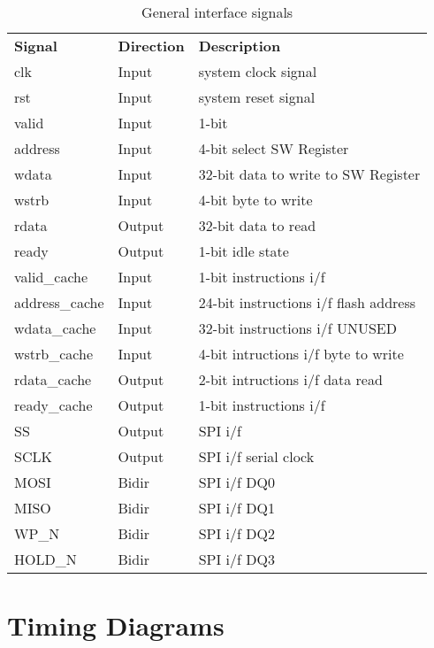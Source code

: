 \documentclass{../../submodules/TEX/document/ug/ug}
\theoremstyle{plain}
\begin{document}
\begin{table}[t]
  \begin{center}
    \begin{tabular}{|l|l|p{8cm}|}
      \hline
      \rowcolor{iob-green}
      \textbf{Signal} & \textbf{Direction} & \textbf{Description} \\
      clk & Input & system clock signal\\
      rst & Input & system reset signal\\
      valid & Input & 1-bit\\
      address & Input & 4-bit select SW Register\\
      wdata & Input & 32-bit data to write to SW Register\\
      wstrb & Input & 4-bit byte to write\\
      rdata & Output & 32-bit data to read\\
      ready & Output & 1-bit idle state\\
      valid\_cache & Input & 1-bit instructions i/f\\
      address\_cache & Input & 24-bit instructions i/f flash address\\
      wdata\_cache & Input & 32-bit instructions i/f UNUSED\\
      wstrb\_cache & Input & 4-bit intructions i/f byte to write\\
      rdata\_cache & Output & 2-bit intructions i/f data read\\
      ready\_cache & Output & 1-bit instructions i/f\\
      SS & Output & SPI i/f \\
      SCLK & Output & SPI i/f serial clock\\
      MOSI & Bidir & SPI i/f DQ0\\
      MISO & Bidir & SPI i/f DQ1\\
      WP\_N & Bidir & SPI i/f DQ2\\
      HOLD\_N & Bidir & SPI i/f DQ3\\
      \hline
      \hline


    \end{tabular}
    \caption{General interface signals}
    \label{tab:is}
  \end{center}
\end{table}


\section{Timing Diagrams}
\end{document}
